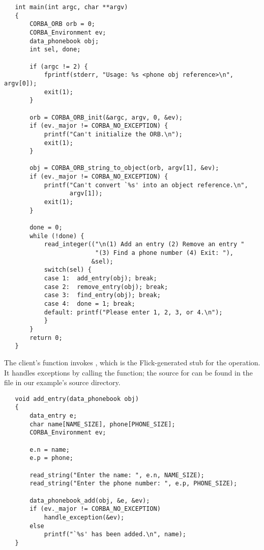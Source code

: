 \begin{verbatim}
   int main(int argc, char **argv)
   {
       CORBA_ORB orb = 0;
       CORBA_Environment ev;
       data_phonebook obj;
       int sel, done;

       if (argc != 2) {
           fprintf(stderr, "Usage: %s <phone obj reference>\n", argv[0]);
           exit(1);
       }

       orb = CORBA_ORB_init(&argc, argv, 0, &ev);
       if (ev._major != CORBA_NO_EXCEPTION) {
           printf("Can't initialize the ORB.\n");
           exit(1);
       }

       obj = CORBA_ORB_string_to_object(orb, argv[1], &ev);
       if (ev._major != CORBA_NO_EXCEPTION) {
           printf("Can't convert `%s' into an object reference.\n",
                  argv[1]);
           exit(1);
       }

       done = 0;
       while (!done) {
           read_integer(("\n(1) Add an entry (2) Remove an entry "
                         "(3) Find a phone number (4) Exit: "),
                        &sel);
           switch(sel) {
           case 1:  add_entry(obj); break;
           case 2:  remove_entry(obj); break;
           case 3:  find_entry(obj); break;
           case 4:  done = 1; break;
           default: printf("Please enter 1, 2, 3, or 4.\n");
           }
       }
       return 0;
   }
\end{verbatim}

The client's  function invokes
, which is the Flick-generated stub for the
 operation.  It handles exceptions by calling the
 function; the source for
 can be found in the  file in
our example's source directory.

\begin{verbatim}
   void add_entry(data_phonebook obj)
   {
       data_entry e;
       char name[NAME_SIZE], phone[PHONE_SIZE];
       CORBA_Environment ev;

       e.n = name;
       e.p = phone;

       read_string("Enter the name: ", e.n, NAME_SIZE);
       read_string("Enter the phone number: ", e.p, PHONE_SIZE);

       data_phonebook_add(obj, &e, &ev);
       if (ev._major != CORBA_NO_EXCEPTION)
           handle_exception(&ev);
       else
           printf("`%s' has been added.\n", name);
   }
\end{verbatim}

